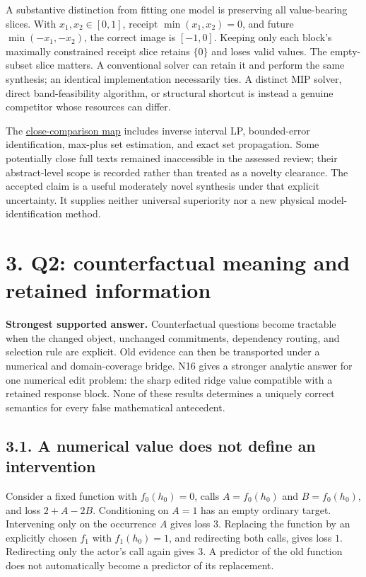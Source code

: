 \documentclass{article}
\theoremstyle{definition}
\begin{document}
A substantive distinction from fitting one model is preserving all
value-bearing slices. With \(x_1,x_2\in[0,1]\), receipt
\(\min(x_1,x_2)=0\), and future \(\min(-x_1,-x_2)\), the correct image
is \([-1,0]\). Keeping only each block's maximally constrained receipt
slice retains \(\{0\}\) and loses valid values. The empty-subset slice
matters. A conventional solver can retain it and perform the same
synthesis; an identical implementation necessarily ties. A distinct MIP
solver, direct band-feasibility algorithm, or structural shortcut is
instead a genuine competitor whose resources can differ.

The
\href{https://github.com/TristanMiano/value_logic/blob/main/v3/report/claims.md}{close-comparison
map} includes inverse interval LP, bounded-error identification,
max-plus set estimation, and exact set propagation. Some potentially
close full texts remained inaccessible in the assessed review; their
abstract-level scope is recorded rather than treated as a novelty
clearance. The accepted claim is a useful moderately novel synthesis
under that explicit uncertainty. It supplies neither universal
superiority nor a new physical model-identification method.

\section{3. Q2: counterfactual meaning and retained
information}\label{sec-q2}

\textbf{Strongest supported answer.} Counterfactual questions become
tractable when the changed object, unchanged commitments, dependency
routing, and selection rule are explicit. Old evidence can then be
transported under a numerical and domain-coverage bridge. N16 gives a
stronger analytic answer for one numerical edit problem: the sharp
edited ridge value compatible with a retained response block. None of
these results determines a uniquely correct semantics for every false
mathematical antecedent.

\subsection{3.1. A numerical value does not define an
intervention}\label{sec-semantics}

Consider a fixed function with \(f_0(h_0)=0\), calls \(A=f_0(h_0)\) and
\(B=f_0(h_0)\), and loss \(2+A-2B\). Conditioning on \(A=1\) has an
empty ordinary target. Intervening only on the occurrence \(A\) gives
loss \(3\). Replacing the function by an explicitly chosen \(f_1\) with
\(f_1(h_0)=1\), and redirecting both calls, gives loss \(1\).
Redirecting only the actor's call again gives \(3\). A predictor of the
old function does not automatically become a predictor of its
replacement.
\end{document}
